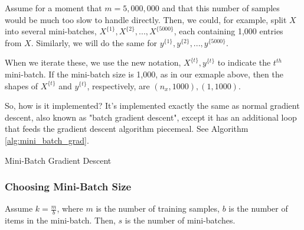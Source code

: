 \documentclass{article}
\begin{document}
Assume for a moment that $m = 5,000,000$ and that this number of samples would be much too slow to handle directly.  Then, we could, for example, split $X$ into several mini-batches, $X^{\{1\}}, X^{\{2\}}, ..., X^{\{5000\}}$, each containing 1,000 entries from $X$.  Similarly, we will do the same for $y^{\{1\}}, y^{\{2\}}, ..., y^{\{5000\}}$.

When we iterate these, we use the new notation, $X^{\{t\}}, y^{\{t\}}$ to indicate the $t^{th}$ mini-batch.  If the mini-batch size is 1,000, as in our exmaple above, then the shapes of $X^{\{t\}}$ and $y^{\{t\}}$, respectively, are $(n_x, 1000), (1, 1000)$.

So, how is it implemented?  It's implemented exactly the same as normal gradient descent, also known as "batch gradient descent", except it has an additional loop that feeds the gradient descent algorithm piecemeal.  See Algorithm \ref{alg:mini_batch_grad}.

\begin{algorithm}[h]
\label{alg:mini_batch_grad}
\caption{Mini-Batch Gradient Descent}
\end{algorithm}

\subsubsection{Choosing Mini-Batch Size}

Assume $k = \frac{m}{b}$, where $m$ is the number of training samples,
$b$ is the number of items in the mini-batch.  Then, $s$ is the number of mini-batches.
\end{document}
